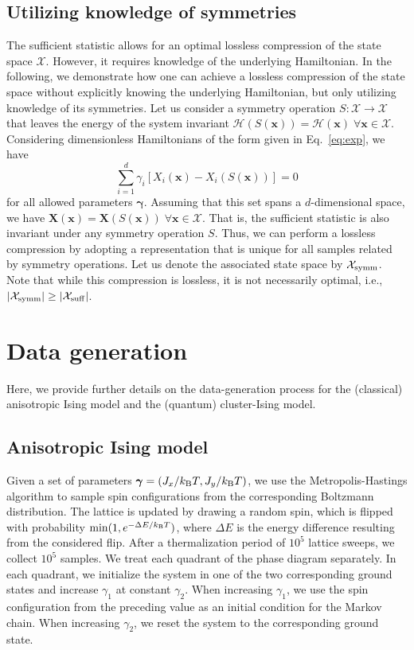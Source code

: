 \documentclass[twocolumn,aps,pra,superscriptaddress,tightlines,nofootinbib]{revtex4-2}
\begin{document}
	\subsection{Utilizing knowledge of symmetries}
	The sufficient statistic allows for an optimal lossless compression of the state space $\mathcal{X}$. However, it requires knowledge of the underlying Hamiltonian. In the following, we demonstrate how one can achieve a lossless compression of the state space without explicitly knowing the underlying Hamiltonian, but only utilizing knowledge of its symmetries. Let us consider a symmetry operation $S: \mathcal{X} \rightarrow \mathcal{X}$ that leaves the energy of the system invariant $\mathcal{H}\left(S(\bm{x})\right) = \mathcal{H}(\bm{x}) \;\forall \bm{x} \in \mathcal{X}$. Considering dimensionless Hamiltonians of the form given in Eq.~\eqref{eq:exp}, we have
	\begin{equation}
		\sum_{i=1}^{d} \gamma_{i} \left[X_{i}(\bm{x}) - X_{i}\left(S(\bm{x})\right)\right] = 0
	\end{equation}
	for all allowed parameters $\bm{\gamma}$. Assuming that this set spans a $d$-dimensional space, we have $\bm{X}(\bm{x}) = \bm{X}\left(S(\bm{x})\right)\; \forall \bm{x} \in \mathcal{X}$. That is, the sufficient statistic is also invariant under any symmetry operation $S$. Thus, we can perform a lossless compression by adopting a representation that is unique for all samples related by symmetry operations. Let us denote the associated state space by $\mathcal{X}_{\rm symm}$. Note that while this compression is lossless, it is not necessarily optimal, i.e., $|\mathcal{X}_{\rm symm}| \geq |\mathcal{X}_{\rm suff}| $.
	
	\section{Data generation}
	Here, we provide further details on the data-generation process for the (classical) anisotropic Ising model and the (quantum) cluster-Ising model.
	\subsection{Anisotropic Ising model}
	Given a set of parameters $\bm{\gamma}=(J_{x}/k_{\rm B}T,J_{y}/k_{\rm B}T)$, we use the Metropolis-Hastings algorithm to sample spin configurations from the corresponding Boltzmann distribution. The lattice is updated by drawing a random spin, which is flipped with probability ${\rm min}(1, e^{-\Delta E/k_{\rm B}T})$, where $\Delta E$ is the energy difference resulting from the considered flip. After a thermalization period of $10^5$ lattice sweeps, we collect $10^{5}$ samples. We treat each quadrant of the phase diagram separately. In each quadrant, we initialize the system in one of the two corresponding ground states and increase $\gamma_{1}$ at constant $\gamma_{2}$. When increasing $\gamma_{1}$, we use the spin configuration from the preceding value as an initial condition for the Markov chain. When increasing $\gamma_{2}$, we reset the system to the corresponding ground state.
	
\end{document}
